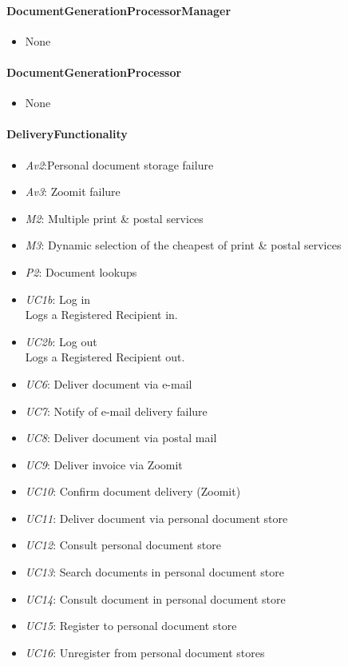 \documentclass[a4paper,10pt]{article}
\begin{document}
\paragraph{DocumentGenerationProcessorManager}
\begin{itemize}
	\item None
\end{itemize}
\paragraph{DocumentGenerationProcessor}
\begin{itemize}
	\item None
\end{itemize}
\paragraph{DeliveryFunctionality}
\begin{itemize}
	\item \emph{Av2}:Personal document storage failure
	\item \emph{Av3}: Zoomit failure
	\item \emph{M2}: Multiple print \& postal services
	\item \emph{M3}: Dynamic selection of the cheapest of print \& postal services
	\item \emph{P2}: Document lookups
	\item \emph{UC1b}: Log in\\ Logs a Registered Recipient in.
    \item \emph{UC2b}: Log out\\ Logs a Registered Recipient out.
	\item \emph{UC6}: Deliver document via e-mail
 	\item \emph{UC7}: Notify of e-mail delivery failure
 	\item \emph{UC8}: Deliver document via postal mail
 	\item \emph{UC9}: Deliver invoice via Zoomit
 	\item \emph{UC10}: Confirm document delivery (Zoomit)
	\item \emph{UC11}: Deliver document via personal document store
	\item \emph{UC12}: Consult personal document store
	\item \emph{UC13}: Search documents in personal document store
	\item \emph{UC14}: Consult document  in personal document store
	\item \emph{UC15}: Register to personal document store
	\item \emph{UC16}: Unregister from personal document stores
\end{itemize}
\end{document}
